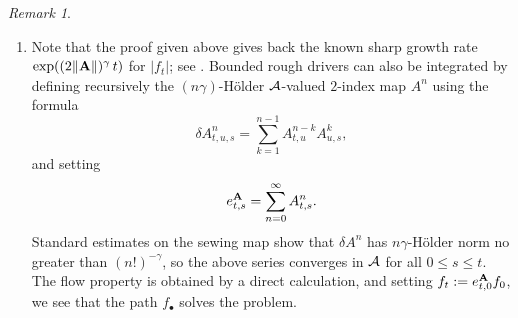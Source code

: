 \documentclass[11pt,a4paper]{amsart}
\renewcommand{\leq}{\leqslant}
\theoremstyle{plain}%
\theoremstyle{definition}
\theoremstyle{remark}
\newtheorem{remark}[theorem]{Remark}
\numberwithin{equation}{section} %
\begin{document}
\smallskip

\begin{remark}
\begin{enumerate}
   \item Note that the proof given above gives back the known sharp growth rate $\exp((2\| {\bf A}\|)^\gamma\,t)$ for $|f_t|$; see \cite{FrizOberhauser}. Bounded rough drivers can also be integrated by defining recursively the $(n\gamma)$-H\"older $\mathcal{A}$-valued $2$-index map $A^n$ using the formula
$$
\delta A^n_{t, u, s} = \sum_{k = 1}^{n - 1} A^{n - k}_{t, u} A^k_{u, s},
$$
and setting 
$$
e^{\bf A}_{t, s} = \sum_{n = 0}^{\infty} A^n_{t, s}.
$$ 
Standard estimates on the sewing map \cite{Gubinelli04} show that $\delta A^n$ has $n \gamma$-H\"older norm  no greater than $(n!)^{- \gamma}$, so the above series converges in $\mathcal{A}$ for all $0 \leq s \leq t$. The flow property is obtained by a direct calculation, and setting $f_t := e^{\bf A}_{t, 0} f_0$, we see that the path $f_\bullet$ solves the problem.   \vspace{0.2cm}


\end{enumerate}
\end{remark}
\end{document}
